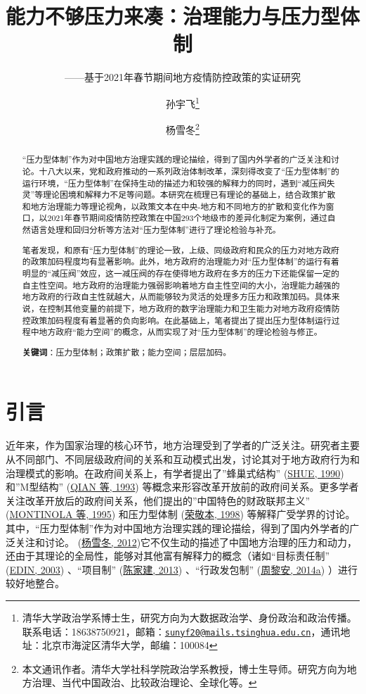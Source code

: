 \documentclass[
  12pt,
]{ctexart}
\title{能力不够压力来凑：治理能力与压力型体制}
\subtitle{------基于2021年春节期间地方疫情防控政策的实证研究}
\author{孙宇飞\footnote{清华大学政治学系博士生，研究方向为大数据政治学、身份政治和政治传播。联系电话：18638750921，邮箱：\href{mailto:sunyf20@mails.tsinghua.edu.cn}{\nolinkurl{sunyf20@mails.tsinghua.edu.cn}}，通讯地址：北京市海淀区清华大学，邮编：100084} \and 杨雪冬\footnote{本文通讯作者。清华大学社科学院政治学系教授，博士生导师。研究方向为地方治理、当代中国政治、比较政治理论、全球化等。}}
\date{}
\begin{document}
\maketitle
\begin{abstract}
``压力型体制''作为对中国地方治理实践的理论描绘，得到了国内外学者的广泛关注和讨论。十八大以来，党和政府推动的一系列政治体制改革，深刻得改变了``压力型体制''的运行环境，``压力型体制''在保持生动的描述力和较强的解释力的同时，遇到``减压阀失灵''等理论困境和解释力不足等问题。本研究在梳理已有理论的基础上，结合政策扩散和地方治理能力等理论视角，以政策文本在中央-地方和不同地方的扩散和变化作为窗口，以2021年春节期间疫情防控政策在中国293个地级市的差异化制定为案例，通过自然语言处理和回归分析等方法对``压力型体制''进行了理论检验与补充。

笔者发现，和原有``压力型体制''的理论一致，上级、同级政府和民众的压力对地方政府的政策加码程度均有显著影响。此外，地方政府的治理能力对``压力型体制''的运行有着明显的``减压阀''效应，这一减压阀的存在使得地方政府在多方的压力下还能保留一定的自主性空间。地方政府的治理能力强弱影响着地方自主性空间的大小，治理能力越强的地方政府的行政自主性就越大，从而能够较为灵活的处理多方压力和政策加码。具体来说，在控制其他变量的前提下，地方政府的数字治理能力和卫生能力对地方政府疫情防控政策加码程度有着显著的负向影响。在此基础上，笔者提出了提出压力型体制运行过程中地方政府``能力空间''的概念，从而实现了对``压力型体制''的理论检验与修正。

\textbf{关键词}：压力型体制；政策扩散；能力空间；层层加码。
\end{abstract}

\hypertarget{ux5f15ux8a00}{%
\section{引言}\label{ux5f15ux8a00}}

近年来，作为国家治理的核心环节，地方治理受到了学者的广泛关注。研究者主要从不同部门、不同层级政府间的关系和互动模式出发，讨论其对于地方政府行为和治理模式的影响。在政府间关系上，有学者提出了''蜂巢式结构'' (\protect\hyperlink{ref-Shue1990}{SHUE, 1990}) 和''M型结构'' (\protect\hyperlink{ref-QianXu1993}{QIAN 等, 1993}) 等概念来形容改革开放前的政府间关系。更多学者关注改革开放后的政府间关系，他们提出的''中国特色的财政联邦主义'' (\protect\hyperlink{ref-MontinolaEtAl1995}{MONTINOLA 等, 1995}) 和压力型体制 (\protect\hyperlink{ref-RongJingBen1998}{荣敬本, 1998}) 等解释广受学界的讨论。其中，``压力型体制''作为对中国地方治理实践的理论描绘，得到了国内外学者的广泛关注和讨论。 (\protect\hyperlink{ref-YangXueDong2012}{杨雪冬, 2012})它不仅生动的描述了中国地方治理的压力和动力，还由于其理论的全局性，能够对其他富有解释力的概念（诸如``目标责任制'' (\protect\hyperlink{ref-Edin2003}{EDIN, 2003}) 、``项目制'' (\protect\hyperlink{ref-ChenJiaJian2013}{陈家建, 2013}) 、``行政发包制'' (\protect\hyperlink{ref-ZhouLiAn2014}{周黎安, 2014a}) ）进行较好地整合。
\end{document}
